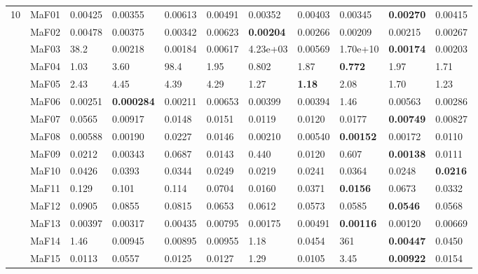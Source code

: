 \documentclass[]{article}
\begin{document}
\begin{landscape}
\begin{table}
\begin{footnotesize}
\begin{tabular}{|l|l|l|l|l|l|l|l|l|l|l|}
\multirow{15}{*}{10} & MaF01 & 0.00425 & \cellcolor{gray95} 0.00355 & 0.00613 & 0.00491 & \cellcolor{gray95} 0.00352 & 0.00403 & \cellcolor{gray95} 0.00345 & \cellcolor{gray95} {\bf 0.00270} & 0.00415\\
 & MaF02 & 0.00478 & 0.00375 & 0.00342 & 0.00623 & \cellcolor{gray95} {\bf 0.00204} & 0.00266 & \cellcolor{gray95} 0.00209 & \cellcolor{gray95} 0.00215 & 0.00267\\
 & MaF03 & 38.2 & 0.00218 & \cellcolor{gray95} 0.00184 & 0.00617 & 4.23e+03 & 0.00569 & 1.70e+10 & \cellcolor{gray95} {\bf 0.00174} & \cellcolor{gray95} 0.00203\\
 & MaF04 & \cellcolor{gray95} 1.03 & 3.60 & 98.4 & 1.95 & \cellcolor{gray95} 0.802 & 1.87 & \cellcolor{gray95} {\bf 0.772} & 1.97 & 1.71\\
 & MaF05 & 2.43 & 4.45 & 4.39 & 4.29 & \cellcolor{gray95} 1.27 & \cellcolor{gray95} {\bf 1.18} & 2.08 & 1.70 & \cellcolor{gray95} 1.23\\
 & MaF06 & \cellcolor{gray95} 0.00251 & \cellcolor{gray95} {\bf 0.000284} & \cellcolor{gray95} 0.00211 & 0.00653 & 0.00399 & 0.00394 & 1.46 & 0.00563 & 0.00286\\
 & MaF07 & 0.0565 & \cellcolor{gray95} 0.00917 & 0.0148 & 0.0151 & 0.0119 & 0.0120 & 0.0177 & \cellcolor{gray95} {\bf 0.00749} & \cellcolor{gray95} 0.00827\\
 & MaF08 & 0.00588 & \cellcolor{gray95} 0.00190 & 0.0227 & 0.0146 & 0.00210 & 0.00540 & \cellcolor{gray95} {\bf 0.00152} & \cellcolor{gray95} 0.00172 & 0.0110\\
 & MaF09 & 0.0212 & \cellcolor{gray95} 0.00343 & 0.0687 & 0.0143 & 0.440 & 0.0120 & 0.607 & \cellcolor{gray95} {\bf 0.00138} & 0.0111\\
 & MaF10 & 0.0426 & 0.0393 & 0.0344 & \cellcolor{gray95} 0.0249 & \cellcolor{gray95} 0.0219 & \cellcolor{gray95} 0.0241 & 0.0364 & \cellcolor{gray95} 0.0248 & \cellcolor{gray95} {\bf 0.0216}\\
 & MaF11 & 0.129 & 0.101 & 0.114 & 0.0704 & \cellcolor{gray95} 0.0160 & \cellcolor{gray95} 0.0371 & \cellcolor{gray95} {\bf 0.0156} & 0.0673 & \cellcolor{gray95} 0.0332\\
 & MaF12 & 0.0905 & 0.0855 & 0.0815 & 0.0653 & 0.0612 & \cellcolor{gray95} 0.0573 & 0.0585 & \cellcolor{gray95} {\bf 0.0546} & \cellcolor{gray95} 0.0568\\
 & MaF13 & 0.00397 & \cellcolor{gray95} 0.00317 & 0.00435 & 0.00795 & \cellcolor{gray95} 0.00175 & 0.00491 & \cellcolor{gray95} {\bf 0.00116} & \cellcolor{gray95} 0.00120 & 0.00669\\
 & MaF14 & 1.46 & 0.00945 & \cellcolor{gray95} 0.00895 & \cellcolor{gray95} 0.00955 & 1.18 & 0.0454 & 361 & \cellcolor{gray95} {\bf 0.00447} & 0.0450\\
 & MaF15 & \cellcolor{gray95} 0.0113 & 0.0557 & 0.0125 & 0.0127 & 1.29 & \cellcolor{gray95} 0.0105 & 3.45 & \cellcolor{gray95} {\bf 0.00922} & 0.0154\\
\hline


\end{tabular}
\end{footnotesize}
\end{table}
\end{landscape}
\end{document}
